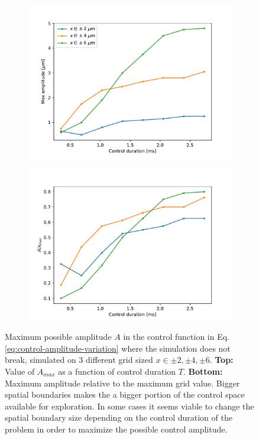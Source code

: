 \documentclass[a4paper, twocolumn]{revtex4-1}
\begin{document}
\begin{figure}
	\begin{subfigure}{\columnwidth}
		\includegraphics[width=\columnwidth]{graphics/numerical-limits/amplitude-variation.pdf}
	\end{subfigure}
	\begin{subfigure}{\columnwidth}
		\includegraphics[width=\columnwidth]{graphics/numerical-limits/amplitude-variation-relative.pdf}
	\end{subfigure}
	\caption{Maximum possible amplitude $A$ in the control function in Eq. \eqref{eq:control-amplitude-variation} where the simulation does not break, simulated on 3 different grid sized $x\in \pm 2, \pm 4, \pm 6$. \textbf{Top:} Value of $A_{max}$ as a function of control duration $T$. \textbf{Bottom:} Maximum amplitude relative to the maximum grid value. Bigger spatial boundaries makes the a bigger portion of the control space available for exploration. In some cases it seems viable to change the spatial boundary size depending on the control duration of the problem in order to maximize the possible control amplitude.}
	\label{fig:amplitude-variations}
\end{figure}
\end{document}
